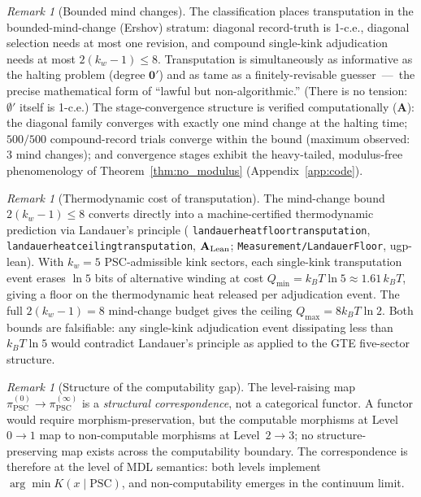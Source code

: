 \documentclass[11pt]{article}
\theoremstyle{remark}
\newtheorem{remark}[theorem]{Remark}
\newcommand{\PSC}{\text{PSC}}
\newcommand{\lean}[1]{%
  \penalty-100
  \begingroup\def\_{\textunderscore\allowbreak}\texttt{#1}\endgroup}
\newcommand{\CatA}{\textbf{A}}
\newcommand{\CatAL}{\ensuremath{\textbf{A}_{\rm Lean}}}
\begin{document}
\begin{remark}[Bounded mind changes]
The classification places transputation in the bounded-mind-change
(Ershov) stratum: diagonal record-truth is 1-c.e., diagonal selection
needs at most one revision, and compound single-kink adjudication needs at
most $2(k_w-1) \leq 8$. Transputation is simultaneously as informative as
the halting problem (degree $\mathbf{0}'$) and as tame as a
finitely-revisable guesser~---~the precise mathematical form of ``lawful
but non-algorithmic.'' (There is no tension: $\emptyset'$ itself is
1-c.e.) The stage-convergence structure is verified computationally
(\CatA): the diagonal family converges with exactly one mind change at
the halting time; $500/500$ compound-record trials converge within the
bound (maximum observed: 3 mind changes); and convergence stages exhibit
the heavy-tailed, modulus-free phenomenology of
Theorem~\ref{thm:no_modulus} (Appendix~\ref{app:code}).
\end{remark}

\begin{remark}[Thermodynamic cost of transputation]
\label{rem:landauer}
The mind-change bound $2(k_w - 1) \leq 8$ converts directly into a
machine-certified thermodynamic prediction via Landauer's principle
(\lean{landauer\_heat\_floor\_transputation}, \lean{landauer\_heat\_ceiling\_transputation},
\CatAL; \texttt{Measurement/LandauerFloor}, ugp-lean).
With $k_w = 5$ PSC-admissible kink sectors, each single-kink transputation
event erases $\ln 5$ bits of alternative winding at cost
$Q_{\min} = k_B T \ln 5 \approx 1.61\,k_B T$, giving a floor on the
thermodynamic heat released per adjudication event. The full
$2(k_w - 1) = 8$ mind-change budget gives the ceiling
$Q_{\max} = 8 k_B T \ln 2$. Both bounds are
falsifiable: any single-kink adjudication event dissipating less than
$k_B T \ln 5$ would contradict Landauer's principle as applied to the
GTE five-sector structure.
\end{remark}

\begin{remark}[Structure of the computability gap]
The level-raising map $\pi_{\PSC}^{(0)} \to \pi_{\PSC}^{(\infty)}$ is a
\emph{structural correspondence}, not a categorical functor. A functor
would require morphism-preservation, but the computable morphisms at
Level~$0\to1$ map to non-computable morphisms at Level~$2\to3$; no
structure-preserving map exists across the computability boundary.
The correspondence is therefore at the level of MDL semantics:
both levels implement $\arg\min K(x \mid \text{PSC})$, and
non-computability emerges in the continuum limit.
\end{remark}
\end{document}
